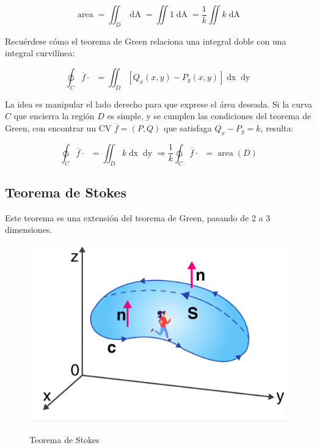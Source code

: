 \documentclass{article}
\begin{document}
\begin{enumerate}
\begin{equation}
\mathop{area(D)} = \iint_D \mathop{dA} = \iint 1 \mathop{dA} = \frac{1}{k} \iint k \mathop{dA}
\end{equation}

Recuérdese cómo el teorema de Green relaciona una integral doble con una integral curvilínea:

\begin{equation}
\ointctrclockwise_{C} \overline{f} \cdot \mathop{\overline{dC}} = \iint_D [Q_x(x,y) - P_y(x,y)] \mathop{dx} \mathop{dy}
\end{equation}

La idea es manipular el lado derecho para que exprese el área deseada. Si la curva $C$ que encierra la región $D$ es simple, y se cumplen las condiciones del teorema de Green, con encontrar un CV $\overline{f} = (P,Q)$ que satisfaga $Q_x - P_y = k$, resulta:

\begin{equation}
\ointctrclockwise_{C} \overline{f} \cdot \mathop{\overline{dC}} = \iint_D k \mathop{dx} \mathop{dy} \Rightarrow \frac{1}{k} \ointctrclockwise_{C} \overline{f} \cdot \mathop{\overline{dC}} = \mathop{area}(D)
\end{equation}

\end{enumerate}

\subsection{Teorema de Stokes}

Este teorema es una extensión del teorema de Green, pasando de 2 a 3 dimensiones.

\begin{figure}[ht]
\centering
\caption{Teorema de Stokes}
\includegraphics[scale=0.5]{img/teoremas/stokes.png}
\label{fig:stokes}
\end{figure}
\end{document}
